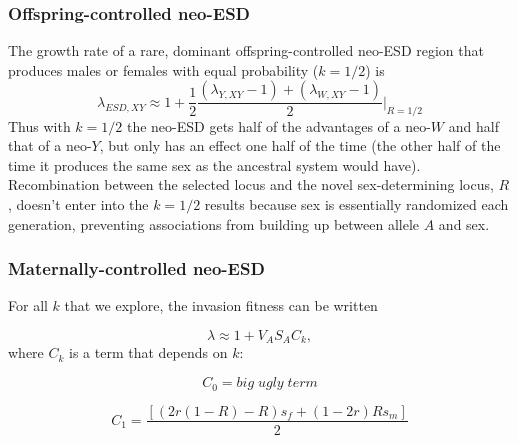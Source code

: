 \documentclass[12pt]{article}
\begin{document}
\subsubsection*{Offspring-controlled neo-ESD}

The growth rate of a rare, dominant offspring-controlled neo-ESD region that produces males or females with equal probability ($k=1/2$) is
\begin{equation}
\lambda_{ESD,XY} \approx 1 + \frac{1}{2}\frac{(\lambda_{Y,XY} - 1) + (\lambda_{W,XY} -1)}{2} \Big|_{R=1/2}
\end{equation}
Thus with $k=1/2$ the neo-ESD gets half of the advantages of a neo-$W$ and half that of a neo-$Y$, but only has an effect one half of the time (the other half of the time it produces the same sex as the ancestral system would have).  
Recombination between the selected locus and the novel sex-determining locus, $R$, doesn't enter into the $k=1/2$ results because sex is essentially randomized each generation, %
preventing associations from building up between allele $A$ and sex.  

\subsubsection*{Maternally-controlled neo-ESD}

For all $k$ that we explore, the invasion fitness can be written

\begin{equation}
\lambda \approx 1 + V_A S_A C_k,
\end{equation}
where
$C_k$ is a term that depends on $k$:

\begin{equation}
C_0 = big \; ugly \; term
\end{equation}

\begin{equation}
C_1 = \frac{\left[ (2r(1-R)-R) s_f + (1-2r)R s_m \right]}{2}
\end{equation}
\end{document}
